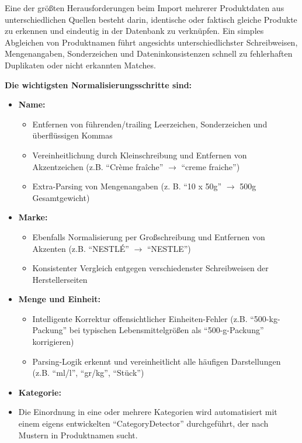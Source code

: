 Eine der größten Herausforderungen beim Import mehrerer Produktdaten aus unterschiedlichen Quellen besteht darin, identische oder faktisch gleiche Produkte zu erkennen und eindeutig in der Datenbank zu verknüpfen. Ein simples Abgleichen von Produktnamen führt angesichts unterschiedlichster Schreibweisen, Mengenangaben, Sonderzeichen und Dateninkonsistenzen schnell zu fehlerhaften Duplikaten oder nicht erkannten Matches.

\textbf{Die wichtigsten Normalisierungsschritte sind:}

\begin{itemize}
    \item \textbf{Name:}
      \begin{itemize}
        \item Entfernen von führenden/trailing Leerzeichen, Sonderzeichen und überflüssigen Kommas
        \item Vereinheitlichung durch Kleinschreibung und Entfernen von Akzentzeichen (z.B. "`Crème fraîche"' $\to$ "`creme fraiche"')
        \item Extra-Parsing von Mengenangaben (z. B. "`10 x 50g"' $\to$ 500g Gesamtgewicht)
      \end{itemize}
    \item \textbf{Marke:}
      \begin{itemize}
        \item Ebenfalls Normalisierung per Großschreibung und Entfernen von Akzenten (z.B. "`NESTLÉ"' $\to$ "`NESTLE"')
        \item Konsistenter Vergleich entgegen verschiedenster Schreibweisen der Herstellerseiten
      \end{itemize}
    \item \textbf{Menge und Einheit:}
      \begin{itemize}
        \item Intelligente Korrektur offensichtlicher Einheiten-Fehler (z.B. "`500-kg-Packung"' bei typischen Lebensmittelgrößen als "`500-g-Packung"' korrigieren)
        \item Parsing-Logik erkennt und vereinheitlicht alle häufigen Darstellungen (z.B. "`ml/l"', "`gr/kg"', "`Stück"')
      \end{itemize}
    \item \textbf{Kategorie:}
      \item Die Einordnung in eine oder mehrere Kategorien wird automatisiert mit einem eigens entwickelten "`CategoryDetector"' durchgeführt, der nach Mustern in Produktnamen sucht.
\end{itemize}

